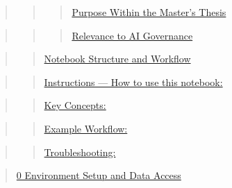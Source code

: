 \documentclass[
  11pt,
  letterpaper,
]{book}
\begin{document}
\begin{quote}
\begin{quote}
\begin{quote}
\hyperref[scrollTo=iDy_leH6DJH_ux26uniqifier=1]{Purpose Within the
Master's Thesis}
\end{quote}
\end{quote}
\end{quote}

\begin{quote}
\begin{quote}
\begin{quote}
\hyperref[scrollTo=iDy_leH6DJH_ux26uniqifier=1]{Relevance to AI
Governance}
\end{quote}
\end{quote}
\end{quote}

\begin{quote}
\begin{quote}
\hyperref[scrollTo=iDy_leH6DJH_ux26uniqifier=1]{Notebook Structure and
Workflow}
\end{quote}
\end{quote}

\begin{quote}
\begin{quote}
\hyperref[scrollTo=22NBzTxxsnfQux26uniqifier=1]{Instructions --- How to
use this notebook:}
\end{quote}
\end{quote}

\begin{quote}
\begin{quote}
\hyperref[scrollTo=NovjnOw6bzLiux26uniqifier=1]{Key Concepts:}
\end{quote}
\end{quote}

\begin{quote}
\begin{quote}
\hyperref[scrollTo=NovjnOw6bzLiux26uniqifier=1]{Example Workflow:}
\end{quote}
\end{quote}

\begin{quote}
\begin{quote}
\hyperref[scrollTo=NovjnOw6bzLiux26uniqifier=1]{Troubleshooting:}
\end{quote}
\end{quote}

\begin{quote}
\hyperref[scrollTo=GTuYkXbCrZ2Oux26uniqifier=1]{0 Environment Setup and
Data Access}
\end{quote}
\end{document}
